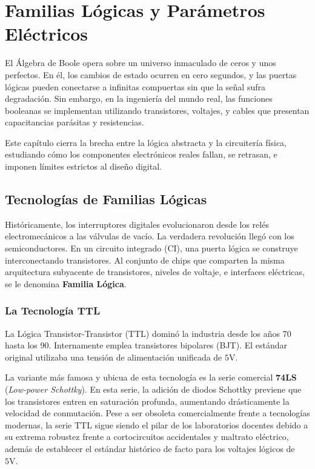 \chapter{Familias Lógicas y Parámetros Eléctricos}

El Álgebra de Boole opera sobre un universo inmaculado de ceros y unos perfectos. En él, los cambios de estado ocurren en cero segundos, y las puertas lógicas pueden conectarse a infinitas compuertas sin que la señal sufra degradación. Sin embargo, en la ingeniería del mundo real, las funciones booleanas se implementan utilizando transistores, voltajes, y cables que presentan capacitancias parásitas y resistencias.

Este capítulo cierra la brecha entre la lógica abstracta y la circuitería física, estudiando cómo los componentes electrónicos reales fallan, se retrasan, e imponen límites estrictos al diseño digital.

\section{Tecnologías de Familias Lógicas}

Históricamente, los interruptores digitales evolucionaron desde los relés electromecánicos a las válvulas de vacío. La verdadera revolución llegó con los semiconductores. En un circuito integrado (CI), una puerta lógica se construye interconectando transistores. Al conjunto de chips que comparten la misma arquitectura subyacente de transistores, niveles de voltaje, e interfaces eléctricas, se le denomina \textbf{Familia Lógica}.

\subsection{La Tecnología TTL}
La Lógica Transistor-Transistor (TTL) dominó la industria desde los años 70 hasta los 90. Internamente emplea transistores bipolares (BJT). El estándar original utilizaba una tensión de alimentación unificada de $5\text{V}.$

La variante más famosa y ubicua de esta tecnología es la serie comercial \textbf{74LS} (\textit{Low-power Schottky}). En esta serie, la adición de diodos Schottky previene que los transistores entren en saturación profunda, aumentando drásticamente la velocidad de conmutación. Pese a ser obsoleta comercialmente frente a tecnologías modernas, la serie TTL sigue siendo el pilar de los laboratorios docentes debido a su extrema robustez frente a cortocircuitos accidentales y maltrato eléctrico, además de establecer el estándar histórico de facto para los voltajes lógicos de $5\text{V}.$

